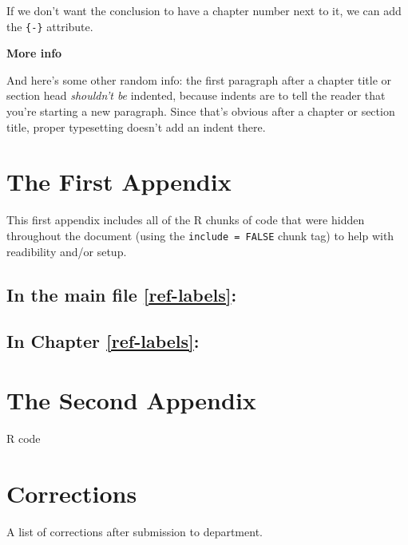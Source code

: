\documentclass[12pt, twoside]{amherstthesis}
\theoremstyle{definition}
\theoremstyle{definition}
\theoremstyle{definition}
\theoremstyle{remark}
\begin{document}
If we don't want the conclusion to have a chapter number next to it, we can add the \texttt{\{-\}} attribute.

\textbf{More info}

And here's some other random info: the first paragraph after a chapter title or section head \emph{shouldn't be} indented, because indents are to tell the reader that you're starting a new paragraph. Since that's obvious after a chapter or section title, proper typesetting doesn't add an indent there.

\appendix

\hypertarget{the-first-appendix}{%
\chapter{The First Appendix}\label{the-first-appendix}}

This first appendix includes all of the R chunks of code that were hidden throughout the document (using the \texttt{include\ =\ FALSE} chunk tag) to help with readibility and/or setup.

\hypertarget{in-the-main-file-refref-labels}{%
\section{In the main file \ref{ref-labels}:}\label{in-the-main-file-refref-labels}}

\hypertarget{in-chapter-refref-labels}{%
\section{In Chapter \ref{ref-labels}:}\label{in-chapter-refref-labels}}

\hypertarget{the-second-appendix}{%
\chapter{The Second Appendix}\label{the-second-appendix}}

R code

\hypertarget{corrections}{%
\chapter*{Corrections}\label{corrections}}

A list of corrections after submission to department.
\end{document}
